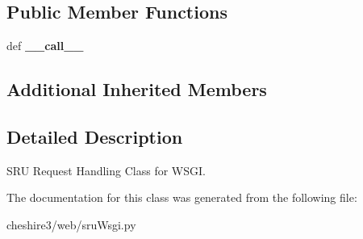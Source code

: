 \subsection*{Public Member Functions}
\begin{DoxyCompactItemize}
\item 
\hypertarget{classcheshire3_1_1web_1_1sru_wsgi_1_1_s_r_u_wsgi_handler_ae06647d1459b04c61b2902003670fb03}{def {\bfseries \-\_\-\-\_\-call\-\_\-\-\_\-}}\label{classcheshire3_1_1web_1_1sru_wsgi_1_1_s_r_u_wsgi_handler_ae06647d1459b04c61b2902003670fb03}

\end{DoxyCompactItemize}
\subsection*{Additional Inherited Members}


\subsection{Detailed Description}
\begin{DoxyVerb}SRU Request Handling Class for WSGI.\end{DoxyVerb}
 

The documentation for this class was generated from the following file\-:\begin{DoxyCompactItemize}
\item 
cheshire3/web/sru\-Wsgi.\-py\end{DoxyCompactItemize}
